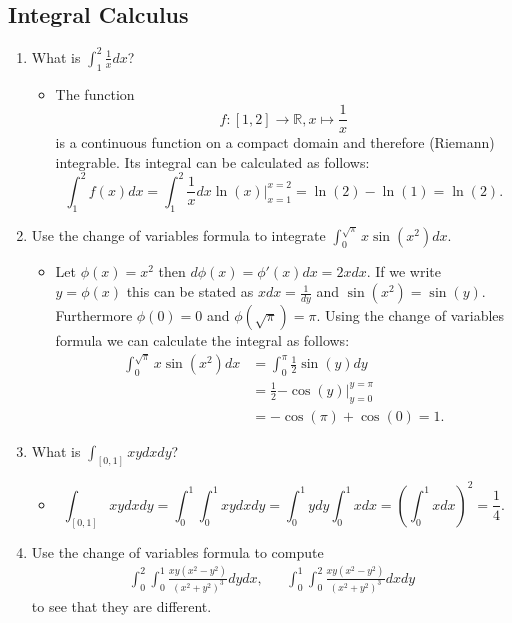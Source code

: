 \documentclass{article}
\begin{document}
\subsection{Integral Calculus}
\begin{enumerate}
	\item What is $\int_1^2 \frac{1}{x} dx$?
		\begin{itemize}
			\item The function
			$$
			f : [1, 2] \rightarrow \mathbb{R}, x \mapsto \frac{1}{x}
			$$
			is a continuous function on a compact domain and therefore (Riemann) integrable. Its integral can be calculated as follows:
			$$
			\int_1^2 f(x) dx = \int_1^2 \frac{1}{x} dx \left. \ln(x)\right|_{x = 1}^{x = 2} = \ln(2) - \ln(1) = \ln(2).
			$$ 
		\end{itemize}
	\item Use the change of variables formula to integrate $\int_0^{\sqrt{\pi}} x \sin(x^2) dx$.
		\begin{itemize}
			\item Let $\phi(x) = x^2$ then $d\phi(x) = \phi'(x) dx = 2x dx$. If we write $y = \phi(x)$ this can be stated as $x dx = \frac{1}{dy}$ and $\sin(x^2) = \sin(y)$. Furthermore $\phi(0) = 0$ and $\phi(\sqrt{\pi}) = \pi$. Using the change of variables formula we can calculate the integral as follows:
			$$
			\begin{aligned}
			\int_0^{\sqrt{\pi}} x \sin(x^2) dx &= \int_0^\pi \frac{1}{2} \sin(y) dy \\
			&= \frac{1}{2} \left. -\cos(y)\right|_{y = 0}^{y = \pi} \\
			&= -\cos(\pi) + \cos(0) = 1.
			\end{aligned}
			$$
		\end{itemize}
	\item What is $\int_{[0, 1]} xy dx dy$?
		\begin{itemize}
		\item
		$$
		\int_{[0, 1]} xy dx dy = \int_0^1 \int_0^1 xy dx dy = \int_0^1 y dy \int_0^1 x dx = \left( \int_0^1 x dx \right)^2 = \frac{1}{4}.
		$$
		\end{itemize}
	\item Use the change of variables formula to compute
		$$
		\begin{aligned}
		\int_0^2 \int_0^1 \frac{xy(x^2 - y^2)}{(x^2 + y^2)^3} dy dx,&& \int_0^1 \int_0^2 \frac{xy(x^2 - y^2)}{(x^2 + y^2)^3} dx dy
		\end{aligned}
		$$
		to see that they are different.
\end{enumerate}
\end{document}
